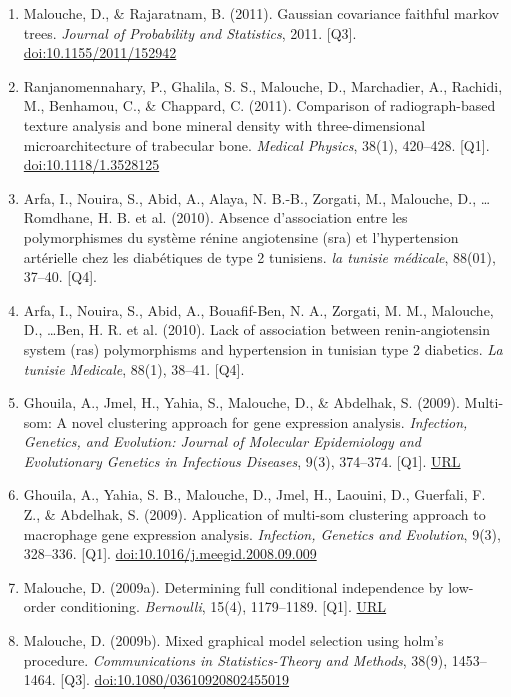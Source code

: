 \documentclass[11pt,a4paper,sans]{moderncv}
\begin{document}
\begin{enumerate}
\item Malouche, D., \& Rajaratnam, B. (2011). Gaussian covariance faithful markov trees. \textit{Journal of Probability and Statistics}, 2011. [Q3]. \href{https://doi.org/10.1155/2011/152942}{doi:10.1155/2011/152942}
\item Ranjanomennahary, P., Ghalila, S. S., Malouche, D., Marchadier, A., Rachidi, M., Benhamou, C., \& Chappard, C. (2011). Comparison of radiograph-based texture analysis and bone mineral density with three-dimensional microarchitecture of trabecular bone. \textit{Medical Physics}, 38(1), 420–428. [Q1]. \href{https://doi.org/10.1118/1.3528125}{doi:10.1118/1.3528125}
\item Arfa, I., Nouira, S., Abid, A., Alaya, N. B.-B., Zorgati, M., Malouche, D., \ldots Romdhane, H. B. et al. (2010). Absence d'association entre les polymorphismes du système rénine angiotensine (sra) et l'hypertension artérielle chez les diabétiques de type 2 tunisiens. \textit{la tunisie médicale}, 88(01), 37–40. [Q4].
\item Arfa, I., Nouira, S., Abid, A., Bouafif-Ben, N. A., Zorgati, M. M., Malouche, D., \ldots Ben, H. R. et al. (2010). Lack of association between renin-angiotensin system (ras) polymorphisms and hypertension in tunisian type 2 diabetics. \textit{La tunisie Medicale}, 88(1), 38–41. [Q4].
\item Ghouila, A., Jmel, H., Yahia, S., Malouche, D., \& Abdelhak, S. (2009). Multi-som: A novel clustering approach for gene expression analysis. \textit{Infection, Genetics, and Evolution: Journal of Molecular Epidemiology and Evolutionary Genetics in Infectious Diseases}, 9(3), 374–374. [Q1]. \href{https://europepmc.org/article/med/18992849}{URL}
\item Ghouila, A., Yahia, S. B., Malouche, D., Jmel, H., Laouini, D., Guerfali, F. Z., \& Abdelhak, S. (2009). Application of multi-som clustering approach to macrophage gene expression analysis. \textit{Infection, Genetics and Evolution}, 9(3), 328–336. [Q1]. \href{https://doi.org/10.1016/j.meegid.2008.09.009}{doi:10.1016/j.meegid.2008.09.009}
\item Malouche, D. (2009a). Determining full conditional independence by low-order conditioning. \textit{Bernoulli}, 15(4), 1179–1189. [Q1]. \href{https://projecteuclid.org/journals/bernoulli/volume-15/issue-4/Determining-full-conditional-independence-by-low-order-conditioning/10.3150/09-BEJ193.full}{URL}
\item Malouche, D. (2009b). Mixed graphical model selection using holm's procedure. \textit{Communications in Statistics-Theory and Methods}, 38(9), 1453–1464. [Q3]. \href{https://doi.org/10.1080/03610920802455019}{doi:10.1080/03610920802455019}

\end{enumerate}
\end{document}
